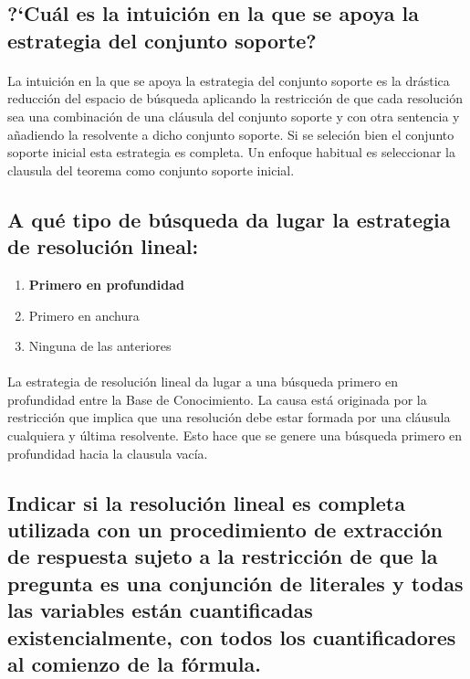 \documentclass[10pt, a4paper,spanish]{article}
\begin{document}
		\subsection{?`Cuál es la intuición en la que se apoya la estrategia del conjunto soporte?}

			\paragraph{}
			La intuición en la que se apoya la estrategia del conjunto soporte es la drástica reducción del espacio de búsqueda aplicando la restricción de que cada resolución sea una combinación de una cláusula del conjunto soporte y con otra sentencia y añadiendo la resolvente a dicho conjunto soporte. Si se seleción bien el conjunto soporte inicial esta estrategia es completa. Un enfoque habitual es seleccionar la clausula del teorema como conjunto soporte inicial.


		\subsection{A qué tipo de búsqueda da lugar la estrategia de resolución lineal:}

			\begin{enumerate}[label=\Alph*)]
				\item \textbf{Primero en profundidad}
				\item Primero en anchura
				\item Ninguna de las anteriores
			\end{enumerate}

			\paragraph{}
			La estrategia de resolución lineal da lugar a una búsqueda primero en profundidad entre la Base de Conocimiento. La causa está originada por la restricción que implica que una resolución debe estar formada por una cláusula cualquiera y última resolvente. Esto hace que se genere una búsqueda primero en profundidad hacia la clausula vacía.


		\subsection{Indicar si la resolución lineal es completa utilizada con un procedimiento de extracción de respuesta sujeto a la restricción de que la pregunta es una conjunción de literales y todas las variables están cuantificadas existencialmente, con todos los cuantificadores al comienzo de la fórmula.}
\end{document}
